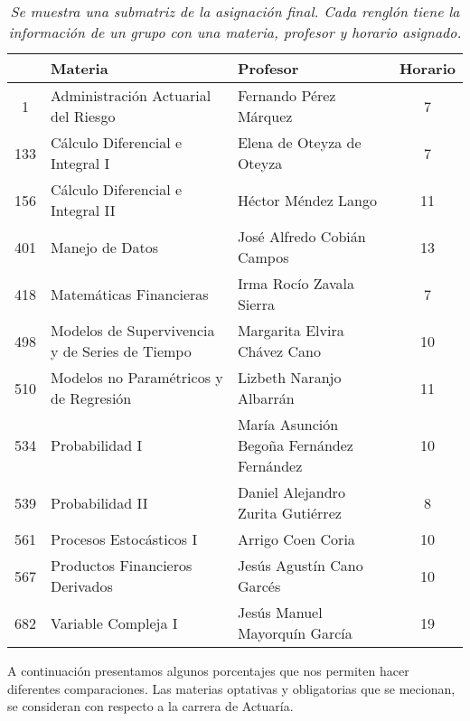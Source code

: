 \begin{table}[H]
\centering
\begin{tabular}{|c|p{7cm}|p{4.7cm}|c|}
\hline
\textbf{ } & \textbf{Materia} & \textbf{Profesor} & \textbf{Horario} \\ \hline
1 & Administración Actuarial del Riesgo & Fernando Pérez Márquez & 7 \\ \hline
  133 & Cálculo Diferencial e Integral I & Elena de Oteyza de Oteyza & 7 \\ \hline
  156 & Cálculo Diferencial e Integral II & Héctor Méndez Lango & 11 \\ \hline
  401 & Manejo de Datos & José Alfredo Cobián Campos & 13 \\ \hline
  418 & Matemáticas Financieras & Irma Rocío Zavala Sierra & 7 \\ \hline
  498 & Modelos de Supervivencia y de Series de Tiempo & Margarita Elvira Chávez Cano & 10 \\ \hline
  510 & Modelos no Paramétricos y de Regresión & Lizbeth Naranjo Albarrán & 11 \\ \hline
  534 & Probabilidad I & María Asunción Begoña Fernández Fernández & 10 \\ \hline
  539 & Probabilidad II & Daniel Alejandro Zurita Gutiérrez & 8 \\ \hline
  561 & Procesos Estocásticos I & Arrigo Coen Coria & 10 \\ \hline
  567 & Productos Financieros Derivados & Jesús Agustín Cano Garcés & 10 \\ \hline
  682 & Variable Compleja I & Jesús Manuel Mayorquín García & 19 \\ \hline
\end{tabular}
\caption[\textit{Submatriz con asignación final}]{\textit{Se muestra una submatriz de la asignación final. Cada renglón tiene la información de un grupo con una materia, profesor y horario asignado.}}\label{submatAsigFinal}
\end{table}


A continuación presentamos algunos porcentajes que nos permiten hacer diferentes comparaciones. Las materias optativas y obligatorias que se mecionan, se consideran con respecto a la carrera de Actuaría.


